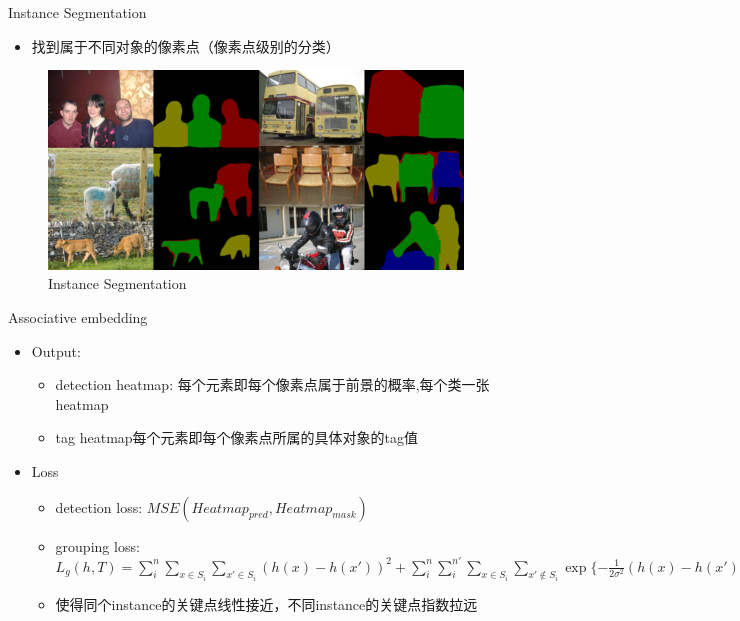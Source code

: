 \documentclass{ctexbeamer}
\begin{document}
    
  \begin{frame}{Instance Segmentation}
  
    \begin{itemize}
      \item 找到属于不同对象的像素点（像素点级别的分类）
    \end{itemize}
    
    \begin{figure}
      \includegraphics[width=11cm]{fig/inst-exs.png}
      \caption{\label{fig:inst-exs}Instance Segmentation}
      \end{figure}
    \vskip 1cm
    
    \end{frame}
    \begin{frame}{Associative embedding}
  
      \begin{itemize}
        \item Output:
        \begin{itemize}
          \item detection heatmap: 每个元素即每个像素点属于前景的概率,每个类一张heatmap
          \item tag heatmap每个元素即每个像素点所属的具体对象的tag值
        \end{itemize}
        \item Loss
        \begin{itemize}
          \item detection loss: $MSE(Heatmap_{pred}, Heatmap_{mask})$
          \item grouping loss: \\$L_g(h,T) = \sum_i^n\sum_{x\in S_i} \sum_{x'\in S_i} (h(x) - h(x'))^2 + \sum_i^n\sum_i^{n'} \sum_{x\in S_i} \sum_{x'\not\in S_{i}} \exp\{-\frac{1}{2\sigma^2} (h(x) - h(x'))^2\}$
          \item 使得同个instance的关键点线性接近，不同instance的关键点指数拉远
        \end{itemize}
      \end{itemize}
      
      \vskip 1cm
      
      \end{frame}
\end{document}
